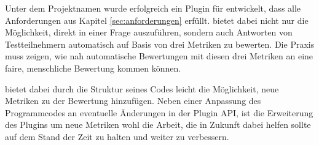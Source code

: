 Unter dem Projektnamen  wurde erfolgreich ein Plugin für  entwickelt, dass alle Anforderungen aus Kapitel \ref{sec:anforderungen} erfüllt.  bietet dabei nicht nur die Möglichkeit,  direkt in einer Frage auszuführen, sondern auch Antworten von Testteilnehmern automatisch auf Basis von drei Metriken zu bewerten. Die Praxis muss zeigen, wie nah automatische Bewertungen mit diesen drei Metriken an eine faire, menschliche Bewertung kommen können.

 bietet dabei durch die Struktur seines Codes leicht die Möglichkeit, neue Metriken zu der Bewertung hinzufügen. Neben einer Anpassung des Programmcodes an eventuelle Änderungen in der  Plugin API, ist die Erweiterung des Plugins um neue Metriken wohl die Arbeit, die in Zukunft dabei helfen sollte  auf dem Stand der Zeit zu halten und weiter zu verbessern.